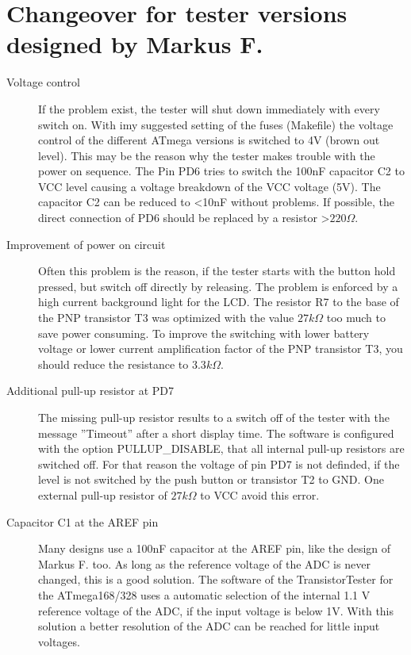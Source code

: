 \section{Changeover for tester versions designed by Markus F.}
\label{sec:change_markus}
\begin{description}

\item[Voltage control]
If the problem exist, the tester will shut down immediately with every switch on.
With imy suggested setting of the fuses (Makefile) the voltage control of the different
ATmega versions is switched to 4V (brown out level).
This may be the reason why the tester makes trouble with the power on sequence.
The Pin PD6 tries to switch the 100nF capacitor C2 to VCC level causing a voltage
breakdown of the VCC voltage (5V).
The capacitor C2 can be reduced to \textless 10nF without problems.
If possible, the direct connection of PD6 should be replaced by a resistor \textgreater \(220 \Omega\).
\item[Improvement of power on circuit]
Often this problem is the reason, if the tester starts with the button hold pressed, but switch off
directly by releasing. The problem is enforced by a high current background light for the LCD.
The resistor R7 to the base of the PNP transistor T3 was optimized with the value \(27k \Omega\) 
too much to save power consuming.
To improve the switching with lower battery voltage or lower current amplification factor of
the PNP transistor T3, you should reduce the resistance to \(3.3k \Omega\).
\item[Additional pull-up resistor at PD7]
The missing pull-up resistor results to a switch off of the tester with the message ''Timeout''
after a short display time.
The software is configured with the option PULLUP\_DISABLE, that all internal pull-up
resistors are switched off. For that reason the voltage of pin PD7 is not definded,
if the level is not switched by the push button or transistor T2 to GND.
One external pull-up resistor of \(27k \Omega\) to VCC avoid this error.
\item[Capacitor C1 at the AREF pin]
Many designs use a 100nF capacitor at the AREF pin, like the design of Markus F. too.
As long as the reference voltage of the ADC is never changed, this is a good solution.
The software of the TransistorTester for the ATmega168/328 uses a automatic selection
of the internal 1.1 V reference voltage of the ADC, if the input voltage is below 1V.
With this solution a better resolution of the ADC can be reached for little input voltages.

\end{description}
